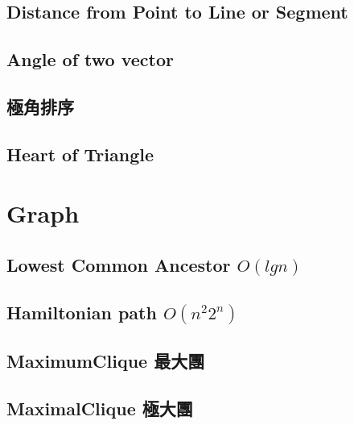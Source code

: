 \documentclass[a4paper,10pt,twocolumn,oneside]{article}
\begin{document}
\subsection{Distance from Point to Line or Segment}



\subsection{Angle of two vector}


\subsection{極角排序}


\subsection{Heart of Triangle}


\section{Graph}

%

\subsection{Lowest Common Ancestor $O(lgn)$}


\subsection{Hamiltonian path $O(n^{2}2^{n})$}


\subsection{MaximumClique 最大團}
% 


\subsection{MaximalClique 極大團}
% 

\end{document}
